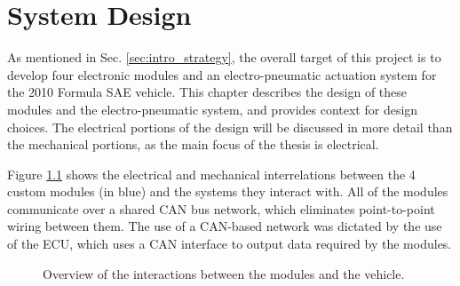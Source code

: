 \chapter{System Design\label{cha:design}}

As mentioned in Sec. \ref{sec:intro_strategy}, the overall target of this project is to develop four electronic modules and an electro-pneumatic actuation system for the 2010 Formula SAE vehicle. This chapter describes the design of these modules and the electro-pneumatic system, and provides context for design choices. The electrical portions of the design will be discussed in more detail than the mechanical portions, as the main focus of the thesis is electrical. 

Figure \ref{fig:design_overview} shows the electrical and mechanical interrelations between the 4 custom modules (in blue) and the systems they interact with. All of the modules communicate over a shared CAN bus network, which eliminates point-to-point wiring between them. The use of a CAN-based network was dictated by the use of the ECU, which uses a CAN interface to output data required by the modules. 

\begin{figure}[H]
\centering

\caption{Overview of the interactions between the modules and the vehicle.}
\label{fig:design_overview}
\end{figure}





